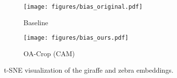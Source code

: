 \begin{figure}[h]
\centering\small
\begin{subfigure}{0.4\textwidth}
\texttt{[image: figures/bias\_original.pdf]}
\caption{Baseline}
\end{subfigure}
\begin{subfigure}{0.4\textwidth}
\texttt{[image: figures/bias\_ours.pdf]}
\caption{OA-Crop (CAM)}
\end{subfigure}
\caption{
t-SNE \citep{van2008visualizing} visualization of the giraffe and zebra embeddings.
}\label{fig:multi-bias}
\end{figure}
